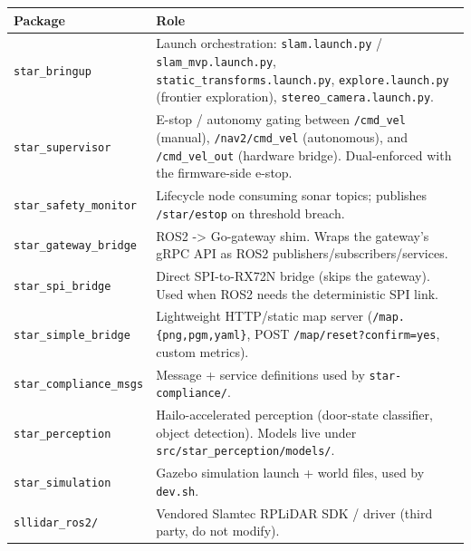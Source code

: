 \begin{center}
\begin{tabular}{|p{4.0cm}|p{10.5cm}|}
\hline
\textbf{Package}                        & \textbf{Role}                                                                                                                                                                       \\
\hline
\texttt{star\_bringup}                  & Launch orchestration: \texttt{slam.launch.py} / \texttt{slam\_mvp.launch.py}, \texttt{static\_transforms.launch.py}, \texttt{explore.launch.py} (frontier exploration), \texttt{stereo\_camera.launch.py}.            \\
\texttt{star\_supervisor}               & E-stop / autonomy gating between \texttt{/cmd\_vel} (manual), \texttt{/nav2/cmd\_vel} (autonomous), and \texttt{/cmd\_vel\_out} (hardware bridge). Dual-enforced with the firmware-side e-stop. \\
\texttt{star\_safety\_monitor}          & Lifecycle node consuming sonar topics; publishes \texttt{/star/estop} on threshold breach.                                                                                              \\
\texttt{star\_gateway\_bridge}          & ROS2 -> Go-gateway shim. Wraps the gateway's gRPC API as ROS2 publishers/subscribers/services.                                                                                          \\
\texttt{star\_spi\_bridge}              & Direct SPI-to-RX72N bridge (skips the gateway). Used when ROS2 needs the deterministic SPI link.                                                                                       \\
\texttt{star\_simple\_bridge}           & Lightweight HTTP/static map server (\texttt{/map.\{png,pgm,yaml\}}, POST \texttt{/map/reset?confirm=yes}, custom metrics).                                                              \\
\texttt{star\_compliance\_msgs}         & Message + service definitions used by \texttt{star-compliance/}.                                                                                                                       \\
\texttt{star\_perception}               & Hailo-accelerated perception (door-state classifier, object detection). Models live under \texttt{src/star\_perception/models/}.                                                       \\
\texttt{star\_simulation}               & Gazebo simulation launch + world files, used by \texttt{dev.sh}.                                                                                                                       \\
\texttt{sllidar\_ros2/}                 & Vendored Slamtec RPLiDAR SDK / driver (third party, do not modify).                                                                                                                    \\
\hline
\end{tabular}
\end{center}

